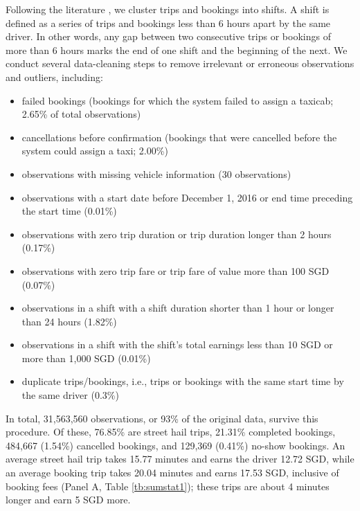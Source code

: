 \documentclass[reviewmode]{AEA}
\begin{document}
Following the literature \citep{farber2015you,agarwal2015singaporean,martin2017quit,chen2015dynamic}, we cluster trips and bookings into shifts. A shift is defined as a series of trips and bookings less than 6 hours apart by the same driver. In other words, any gap between two consecutive trips or bookings of more than 6 hours marks the end of one shift and the beginning of the next. We conduct several data-cleaning steps to remove irrelevant or erroneous observations and outliers, including:
\begin{itemize}[noitemsep,nolistsep]
	\item failed bookings (bookings for which the system failed to assign a taxicab; 2.65\% of total observations)
	\item cancellations before confirmation (bookings that were cancelled before the system could assign a taxi; 2.00\%)
	\item observations with missing vehicle information (30 observations)
	\item observations with a start date before December 1, 2016 or end time preceding the start time (0.01\%)
	\item observations with zero trip duration or trip duration longer than 2 hours (0.17\%)
	\item observations with zero trip fare or trip fare of value more than 100 SGD (0.07\%)%
	\item observations in a shift with a shift duration shorter than 1 hour or longer than 24 hours (1.82\%)
	\item observations in a shift with the shift's total earnings less than 10 SGD or more than 1,000 SGD (0.01\%)%
	\item duplicate trips/bookings, i.e., trips or bookings with the same start time by the same driver (0.3\%)
\end{itemize}

In total, 31,563,560 observations, or 93\% of the original data, survive this procedure. Of these, 76.85\% are street hail trips, 21.31\% completed bookings, 484,667 (1.54\%) cancelled bookings, and 129,369 (0.41\%) no-show bookings. An average street hail trip takes 15.77 minutes and earns the driver 12.72 SGD, while an average  booking trip takes 20.04 minutes and earns 17.53 SGD, inclusive of booking fees (Panel A, Table \ref{tb:sumstat1}); these trips are about 4 minutes longer and earn 5 SGD more.
\end{document}
